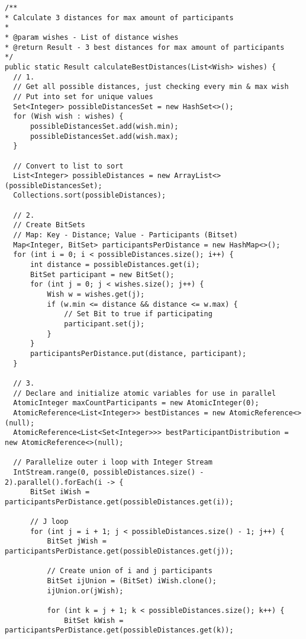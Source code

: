 \documentclass[a4paper,10pt,ngerman]{scrartcl}
\begin{document}
\begin{lstlisting}
/**
* Calculate 3 distances for max amount of participants
* 
* @param wishes - List of distance wishes
* @return Result - 3 best distances for max amount of participants
*/
public static Result calculateBestDistances(List<Wish> wishes) {
  // 1.
  // Get all possible distances, just checking every min & max wish
  // Put into set for unique values
  Set<Integer> possibleDistancesSet = new HashSet<>();
  for (Wish wish : wishes) {
      possibleDistancesSet.add(wish.min);
      possibleDistancesSet.add(wish.max);
  }

  // Convert to list to sort
  List<Integer> possibleDistances = new ArrayList<>(possibleDistancesSet);
  Collections.sort(possibleDistances);

  // 2.
  // Create BitSets
  // Map: Key - Distance; Value - Participants (Bitset)
  Map<Integer, BitSet> participantsPerDistance = new HashMap<>();
  for (int i = 0; i < possibleDistances.size(); i++) {
      int distance = possibleDistances.get(i);
      BitSet participant = new BitSet();
      for (int j = 0; j < wishes.size(); j++) {
          Wish w = wishes.get(j);
          if (w.min <= distance && distance <= w.max) {
              // Set Bit to true if participating
              participant.set(j);
          }
      }
      participantsPerDistance.put(distance, participant);
  }

  // 3.
  // Declare and initialize atomic variables for use in parallel
  AtomicInteger maxCountParticipants = new AtomicInteger(0);
  AtomicReference<List<Integer>> bestDistances = new AtomicReference<>(null);
  AtomicReference<List<Set<Integer>>> bestParticipantDistribution = new AtomicReference<>(null);

  // Parallelize outer i loop with Integer Stream
  IntStream.range(0, possibleDistances.size() - 2).parallel().forEach(i -> {
      BitSet iWish = participantsPerDistance.get(possibleDistances.get(i));

      // J loop
      for (int j = i + 1; j < possibleDistances.size() - 1; j++) {
          BitSet jWish = participantsPerDistance.get(possibleDistances.get(j));

          // Create union of i and j participants
          BitSet ijUnion = (BitSet) iWish.clone();
          ijUnion.or(jWish);

          for (int k = j + 1; k < possibleDistances.size(); k++) {
              BitSet kWish = participantsPerDistance.get(possibleDistances.get(k));


\end{lstlisting}
\end{document}
